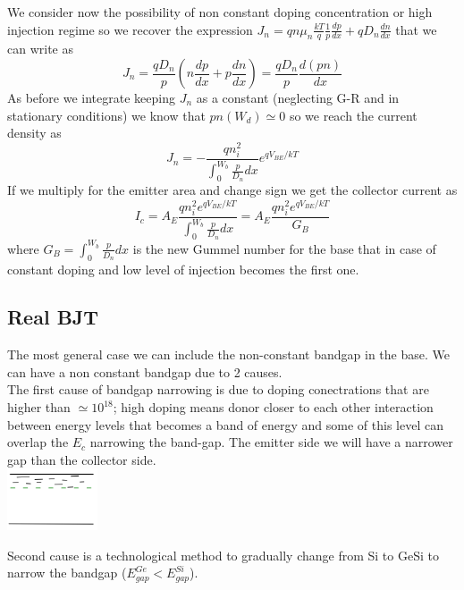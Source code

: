 We consider now the possibility of non constant doping concentration or high injection regime so we recover the expression $J_n=qn\mu_n \frac{kT}{q}\frac{1}{p}\frac{dp}{dx}+qD_n \frac{dn}{dx}$ that we can write as
\begin{equation}
J_n=\frac{qD_n}{p}\left(n \frac{dp}{dx}+p \frac{dn}{dx}\right)= \frac{qD_n}{p}\frac{d(pn)}{dx}
\end{equation}
As before we integrate keeping $J_n$ as a constant (neglecting G-R and in stationary conditions) we know that $pn(W_d)\simeq 0$ so we reach the current density as 
\begin{equation}
J_n=-\frac{qn_i^2}{\int^{W_b}_0 \frac{p}{D_n}dx}e^{qV_{BE}/kT}
\end{equation}
If we multiply for the emitter area and change sign we get the collector current as 
\begin{equation}
I_c=A_E\frac{qn_i^2 e^{qV_{BE}/kT}}{\int^{W_b}_0 \frac{p}{D_n}dx}=A_E\frac{qn_i^2 e^{qV_{BE}/kT}}{G_B}
\end{equation}
where $G_B=\int^{W_b}_0 \frac{p}{D_n}dx$ is the new Gummel number for the base that in case of constant doping and low level of injection becomes the first one.\\

\subsection{Real BJT}

The most general case we can include the non-constant bandgap in the base. We can have a non constant bandgap due to 2 causes.\\
The first cause of bandgap narrowing is due to doping conectrations that are higher than $\simeq 10^{18}$; high doping means donor closer to each other interaction between energy levels that becomes a band of energy and some of this level can overlap the $E_c$ narrowing the band-gap. The emitter side we will have a narrower gap than the collector side.\\

\centering
\includegraphics[width=0.2\textwidth]{bjt5.png}\\
\raggedright

Second cause is a technological method to gradually change from Si to GeSi to narrow the bandgap ($E_{gap}^{Ge}<E_{gap}^{Si}$).

